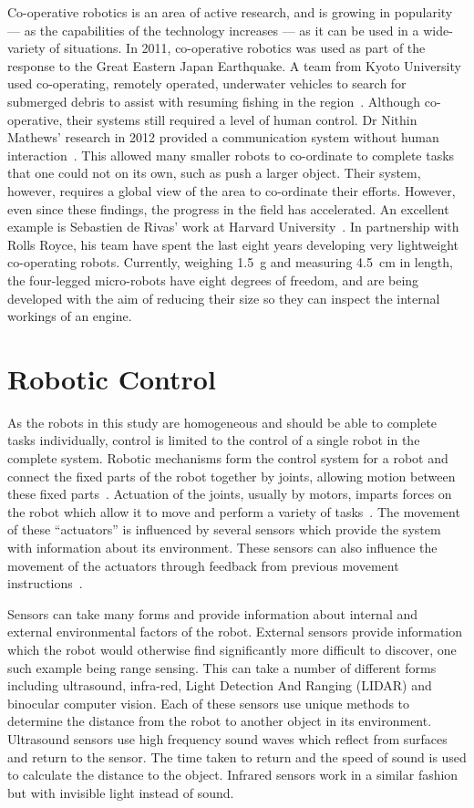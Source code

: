Co-operative robotics is an area of active research, and is growing in popularity --- as the
capabilities of the technology increases --- as it can be used in a wide-variety of
situations. In 2011, co-operative robotics was used as part of the
response to the Great Eastern Japan Earthquake. A team from Kyoto University
used co-operating, remotely operated, underwater vehicles to search for submerged
debris to assist with resuming fishing in the region~\cite{matsuno2014utilization}.
Although co-operative, their systems still required a level of human control.
Dr Nithin Mathews' research in 2012 provided a communication system without
human interaction~\cite{mathews2012spatially}. This allowed many smaller robots
to co-ordinate to complete tasks that one could not on its own, such as push a
larger object. Their system, however, requires a global view of the area to
co-ordinate their efforts. However, even since these findings, the progress
in the field has accelerated. An excellent example is Sebastien de Rivas' work at
Harvard University~\cite{rollsroyceSWARM}. In partnership with Rolls Royce, his
team have spent the last eight years developing very lightweight co-operating robots.
Currently, weighing \SI{1.5}{\g} and measuring \SI{4.5}{\cm} in length, the
four-legged micro-robots have eight degrees of freedom, and are being developed with
the aim of reducing their size so they can inspect the internal workings of an engine.

\section{Robotic Control} \label{litreview/robotics/control}
As the robots in this study are homogeneous and should be able to complete
tasks individually, control is limited to the control of a single robot in the
complete system. Robotic mechanisms form the control system for a robot and
connect the fixed parts of the robot together by joints, allowing motion between
these fixed parts~\cite{lynch2017modern}. Actuation of the joints, usually
by motors, imparts forces on the robot which allow it to move and perform a
variety of tasks~\cite{lynch2017modern}. The movement of these ``actuators''
is influenced by several sensors which provide the system with information
about its environment. These sensors can also influence the movement of the
actuators through feedback from previous movement instructions~\cite{lynch2017modern}.

Sensors can take many forms and provide information about internal and external
environmental factors of the robot. External sensors provide information which
the robot would otherwise find significantly more difficult to discover, one
such example being range sensing. This can take a number of different forms
including ultrasound, infra-red, Light Detection And Ranging (LIDAR) and
binocular computer vision. Each of these sensors use unique methods to determine
the distance from the robot to another object in its environment. Ultrasound
sensors use high frequency sound waves which reflect from surfaces and return
to the sensor. The time taken to return and the speed of sound is used to
calculate the distance to the object. Infrared sensors work in a similar
fashion but with invisible light instead of sound.

